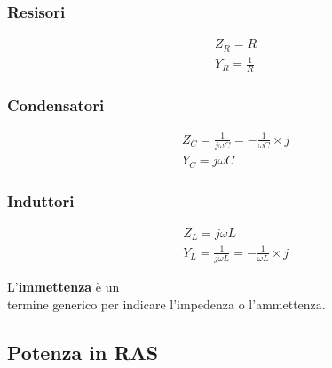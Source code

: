 \documentclass[10pt]{article}
\begin{document}
        \begin{multicols}{4}
            
            \subsubsection*{Resisori}

                \begin{align*}
                    &Z_R = R\\
                    &Y_R = \frac{1}{R}
                \end{align*}

            \vfill\null
            \columnbreak

            \subsubsection*{Condensatori}

                \begin{align*}
                    &Z_C = \frac{1}{j \omega C} = - \frac{1}{\omega C} \times j\\
                    &Y_C = j \omega C
                \end{align*}

            \vfill\null
            \columnbreak

            \subsubsection*{Induttori}

                \begin{align*}
                    &Z_L = j \omega L\\
                    &Y_L = \frac{1}{j \omega L} = -\frac{1}{\omega L} \times j
                \end{align*}

            \vfill\null
            \columnbreak

            \noindent L'\textbf{immettenza} è un\\termine generico per indicare l'impedenza o l'ammettenza.

        \end{multicols}

    \vspace{-3\baselineskip}
    \subsection*{Potenza in RAS}
    \vspace{-1.5\baselineskip}
\end{document}

